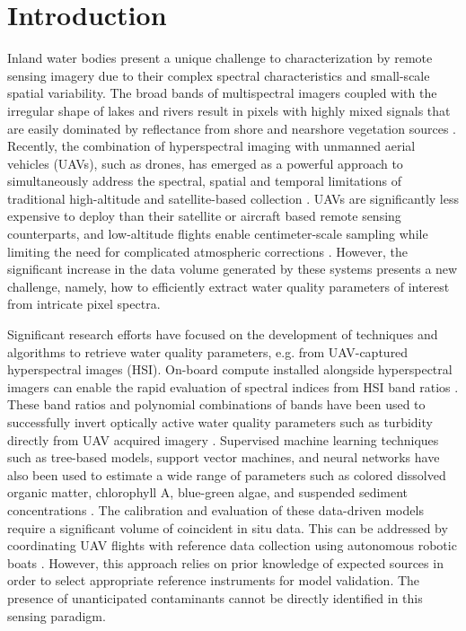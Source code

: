 \documentclass[remotesensing,article,submit,pdftex,moreauthors]{Definitions/mdpi}
\begin{document}
\section{Introduction}

Inland water bodies present a unique challenge to characterization by remote sensing imagery due to their complex spectral characteristics and small-scale spatial variability. The broad bands of multispectral imagers coupled with the irregular shape of lakes and rivers result in pixels with highly mixed signals that are easily dominated by reflectance from shore and nearshore vegetation sources \cite{koponen2002lake, ritchie2003remote}. Recently, the combination of hyperspectral imaging with unmanned aerial vehicles (UAVs), such as drones, has emerged as a powerful approach to simultaneously address the spectral, spatial and temporal limitations of traditional high-altitude and satellite-based collection \cite{adao2017hyperspectral,arroyo2019implementation}. UAVs are significantly less expensive to deploy than their satellite or aircraft based remote sensing counterparts, and low-altitude flights enable centimeter-scale sampling while limiting the need for complicated atmospheric corrections \cite{banerjee2020uav}. However, the significant increase in the data volume generated by these systems presents a new challenge, namely, how to efficiently extract water quality parameters of interest from intricate pixel spectra.

Significant research efforts have focused on the development of techniques and algorithms to retrieve water quality parameters, e.g. from UAV-captured hyperspectral images (HSI). On-board compute installed alongside hyperspectral imagers can enable the rapid evaluation of spectral indices from HSI band ratios \cite{horstrand2019uav}. These band ratios and polynomial combinations of bands have been used to successfully invert optically active water quality parameters such as turbidity directly from UAV acquired imagery \cite{vogt2016near, zhang2022selection}. Supervised machine learning techniques such as tree-based models, support vector machines, and neural networks have also been used to estimate a wide range of parameters such as colored dissolved organic matter, chlorophyll A, blue-green algae, and suspended sediment concentrations \cite{keller2018hyperspectral, lu2021retrieval}. The calibration and evaluation of these data-driven models require a significant volume of coincident in situ data. This can be addressed by coordinating UAV flights with reference data collection using autonomous robotic boats \cite{robot-team-1, robot-team-2}. However, this approach relies on prior knowledge of expected sources in order to select appropriate reference instruments for model validation. The presence of unanticipated contaminants cannot be directly identified in this sensing paradigm. 
\end{document}
